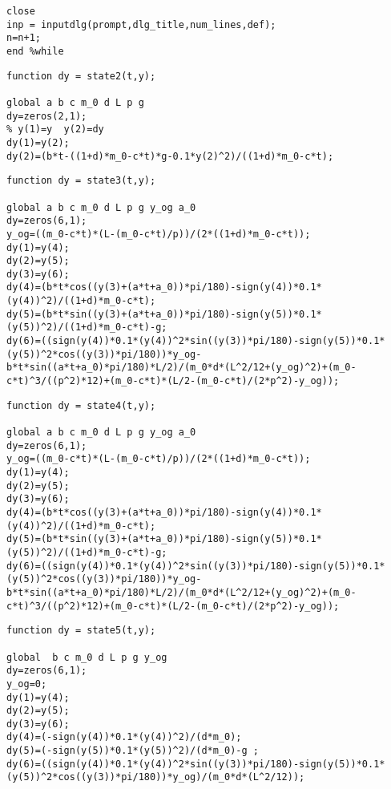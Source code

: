 \documentclass[UTF8]{article}
\begin{document}
\begin{appendix}
\begin{lstlisting}[title=main.m, frame=shadowbox]
close
inp = inputdlg(prompt,dlg_title,num_lines,def);
n=n+1;
end %while
\end{lstlisting}
\begin{lstlisting}[title=state2.m, frame=shadowbox]
function dy = state2(t,y);

global a b c m_0 d L p g
dy=zeros(2,1);
% y(1)=y  y(2)=dy
dy(1)=y(2);
dy(2)=(b*t-((1+d)*m_0-c*t)*g-0.1*y(2)^2)/((1+d)*m_0-c*t);
\end{lstlisting}
\begin{lstlisting}[title=state3.m, frame=shadowbox]
function dy = state3(t,y);

global a b c m_0 d L p g y_og a_0
dy=zeros(6,1);
y_og=((m_0-c*t)*(L-(m_0-c*t)/p))/(2*((1+d)*m_0-c*t));
dy(1)=y(4);
dy(2)=y(5);
dy(3)=y(6);
dy(4)=(b*t*cos((y(3)+(a*t+a_0))*pi/180)-sign(y(4))*0.1*(y(4))^2)/((1+d)*m_0-c*t);
dy(5)=(b*t*sin((y(3)+(a*t+a_0))*pi/180)-sign(y(5))*0.1*(y(5))^2)/((1+d)*m_0-c*t)-g;
dy(6)=((sign(y(4))*0.1*(y(4))^2*sin((y(3))*pi/180)-sign(y(5))*0.1*(y(5))^2*cos((y(3))*pi/180))*y_og-b*t*sin((a*t+a_0)*pi/180)*L/2)/(m_0*d*(L^2/12+(y_og)^2)+(m_0-c*t)^3/((p^2)*12)+(m_0-c*t)*(L/2-(m_0-c*t)/(2*p^2)-y_og));
\end{lstlisting}
\begin{lstlisting}[title=state4.m, frame=shadowbox]
function dy = state4(t,y);

global a b c m_0 d L p g y_og a_0
dy=zeros(6,1);
y_og=((m_0-c*t)*(L-(m_0-c*t)/p))/(2*((1+d)*m_0-c*t));
dy(1)=y(4);
dy(2)=y(5);
dy(3)=y(6);
dy(4)=(b*t*cos((y(3)+(a*t+a_0))*pi/180)-sign(y(4))*0.1*(y(4))^2)/((1+d)*m_0-c*t);
dy(5)=(b*t*sin((y(3)+(a*t+a_0))*pi/180)-sign(y(5))*0.1*(y(5))^2)/((1+d)*m_0-c*t)-g;
dy(6)=((sign(y(4))*0.1*(y(4))^2*sin((y(3))*pi/180)-sign(y(5))*0.1*(y(5))^2*cos((y(3))*pi/180))*y_og-b*t*sin((a*t+a_0)*pi/180)*L/2)/(m_0*d*(L^2/12+(y_og)^2)+(m_0-c*t)^3/((p^2)*12)+(m_0-c*t)*(L/2-(m_0-c*t)/(2*p^2)-y_og));
\end{lstlisting}
\begin{lstlisting}[title=state5.m, frame=shadowbox]
function dy = state5(t,y);

global  b c m_0 d L p g y_og
dy=zeros(6,1);
y_og=0;
dy(1)=y(4);
dy(2)=y(5);
dy(3)=y(6);
dy(4)=(-sign(y(4))*0.1*(y(4))^2)/(d*m_0);
dy(5)=(-sign(y(5))*0.1*(y(5))^2)/(d*m_0)-g ;
dy(6)=((sign(y(4))*0.1*(y(4))^2*sin((y(3))*pi/180)-sign(y(5))*0.1*(y(5))^2*cos((y(3))*pi/180))*y_og)/(m_0*d*(L^2/12));
\end{lstlisting}
\end{appendix}
\end{document}
